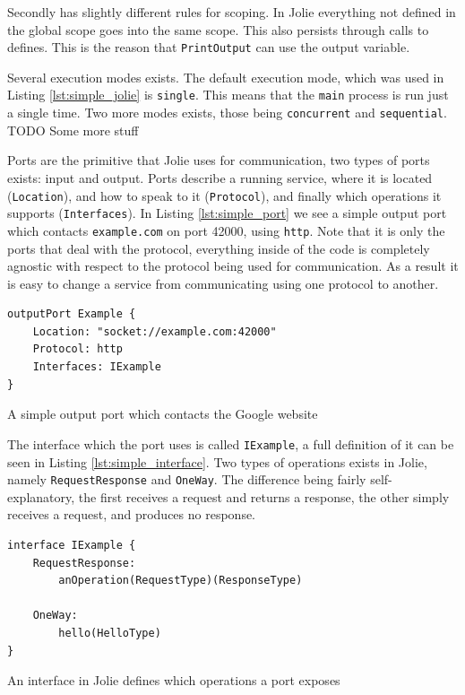 Secondly has slightly different rules for scoping. In Jolie everything not
defined in the global scope goes into the same scope. This also persists
through calls to defines. This is the reason that \verb!PrintOutput! can use
the output variable.

Several execution modes exists. The default execution mode, which was used in
Listing \ref{lst:simple_jolie} is \verb!single!. This means that the
\verb!main!  process is run just a single time. Two more modes exists, those
being \verb!concurrent! and \verb!sequential!. TODO Some more stuff

Ports are the primitive that Jolie uses for communication, two types of ports
exists: input and output. Ports describe a running service, where it is located
(\verb!Location!), and how to speak to it (\verb!Protocol!), and finally which
operations it supports (\verb!Interfaces!). In Listing \ref{lst:simple_port} we
see a simple output port which contacts \verb!example.com! on port 42000, using
\verb!http!. Note that it is only the ports that deal with the protocol,
everything inside of the code is completely agnostic with respect to the
protocol being used for communication. As a result it is easy to change a
service from communicating using one protocol to another.

\begin{listing}[H]
\begin{verbatim}
outputPort Example {
    Location: "socket://example.com:42000"
    Protocol: http
    Interfaces: IExample
}
\end{verbatim}
\caption{A simple output port which contacts the Google website}
\label{lst:simple_port}
\end{listing}

The interface which the port uses is called \verb!IExample!, a full definition
of it can be seen in Listing \ref{lst:simple_interface}. Two types of
operations exists in Jolie, namely \verb!RequestResponse! and \verb!OneWay!.
The difference being fairly self-explanatory, the first receives a request and
returns a response, the other simply receives a request, and produces no
response.

\begin{listing}[H]
\begin{verbatim}
interface IExample {
    RequestResponse:
        anOperation(RequestType)(ResponseType)

    OneWay:
        hello(HelloType)
}
\end{verbatim}
\caption{An interface in Jolie defines which operations a port exposes}
\label{lst:simple_interface}
\end{listing}

